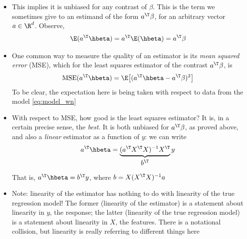 \documentclass{article}
\begin{document}
\begin{itemize}
\item This implies it is unbiased for any contrast of $\beta$. This is the term 
  we sometimes give to an estimand of the form $a^\T\beta$, for an 
  arbitrary vector $a \in \R^d$. Observe, 
  \[
  \E(a^\T \hbeta) = a^\T \E(\hbeta) = a^\T \beta
  \]

\item One common way to measure the quality of an estimator is its \emph{mean
    squared error} (MSE), which for the least squares estimator  of the contrast $a^\T \beta$, is
  \[
  \MSE(a^\T \hbeta) = \E\big[ (a^\T \hbeta - a^\T \beta)^2 \big]
  \]
  To be clear, the expectation here is being taken with respect to data from the
  model \eqref{eq:model_wn} 

\item With respect to MSE, how good is the least squares estimator? It is, in a
  certain precise sense, the \emph{best}. It is both unbiased for $a^\T \beta$,
  as proved above, and also a \emph{linear} estimator as a function of $y$: we
  can write  
  \[
  a^\T \hbeta = \underbrace{(a^\T X^\T X)^{-1}
    X^\T}_{\textstyle \begin{array}{c} b^\T \end{array}} y  
  \]
  That is, $a^\T \hbeta = b^\T y$, where $b = X (X^\T X)^{-1} a$ 


\item Note: linearity of the estimator has nothing to do with linearity of the
  true regression model! The former (linearity of the estimator) is a statement
  about linearity in $y$, the response; the latter (linearity of the true
  regression model) is a statement about linearity in $X$, the features. There
  is a notational collision, but linearity is really referring to different
  things here 


\end{itemize}
\end{document}
